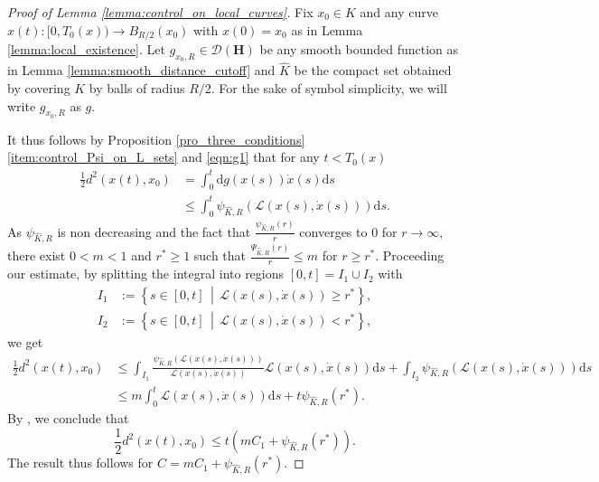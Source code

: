 \documentclass[a4paper]{article}
\newcommand{\cD}{\mathcal{D}}
\newcommand{\cL}{\mathcal{L}}
\newcommand{\dd}{ \mathrm{d}}
\numberwithin{equation}{section}
\theoremstyle{definition}
\begin{document}
\begin{proof}[Proof of Lemma \ref{lemma:control_on_local_curves}]
Fix $x_0 \in K$ and any curve $x(t) : [0,T_0(x)) \rightarrow B_{R/2}(x_0)$ with $x(0) = x_0$ as in Lemma \ref{lemma:local_existence}. Let $g_{x_0,R} \in \cD(\mathbf{H})$ be any smooth bounded function as in Lemma \ref{lemma:smooth_distance_cutoff} and $\hat{K}$ be the compact set obtained by covering $K$ by balls of radius $R/2$. 
For the sake of symbol simplicity, we will write $g_{x_0,R}$ as $g$.
\par
It thus follows by Proposition \ref{pro_three_conditions} \ref{item:control_Psi_on_L_sets} and \eqref{eqn:g1} that for any $t < T_0(x)$
\begin{align*}
    \frac{1}{2}d^2(x(t),x_0) 
    & = \int_0^t \dd g(x(s)) \dot{x}(s) \dd s \\
    & \leq \int_0^t \psi_{\hat{K},R}\left( \cL(x(s),\dot{x}(s))\right) \dd s.
\end{align*}
As $\psi_{\hat{K},R}$ is non decreasing and the fact that $\frac{\psi_{\hat{K},R}(r)}{r}$ converges to $0$ for $r\to \infty$, there exist $0<m<1$ and $r^*\geq 1$ such that $\frac{\Psi_{\hat{K},R}(r)}{r}\leq m$ for $r \geq r^*$. Proceeding our estimate, by splitting the integral into regions $[0,t] = I_1 \cup I_2$ with
\begin{align*}
    I_1 & := \left\{s \in [0,t] \, \middle| \, \cL(x(s),\dot{x}(s)) \geq r^*\right\}, \\
    I_2 & := \left\{s \in [0,t] \, \middle| \, \cL(x(s),\dot{x}(s)) < r^*\right\},
\end{align*}
we get
\begin{align*}
    \frac{1}{2}d^2(x(t),x_0) & \leq \int_{I_1} \frac{\psi_{\hat{K},R}(\cL(x(s),\dot{x}(s)))}{\cL(x(s),\dot{x}(s))}\cL(x(s),\dot{x}(s)) \dd s +\int_{I_2} \psi_{\hat{K},R}(\cL(x(s),\dot{x}(s))) \dd s \\
    & \leq m \int_0^t \cL(x(s),\dot{x}(s)) \dd s + t \psi_{\hat{K},R}(r^*).
\end{align*}
By , we conclude that
\begin{equation*}
    \frac{1}{2}d^2(x(t),x_0)  \leq t\left(mC_1+ \psi_{\hat{K},R}(r^*)\right).
\end{equation*}
The result thus follows for $C = mC_1 + \psi_{\hat{K},R}(r^*)$.   
\end{proof}
\end{document}
